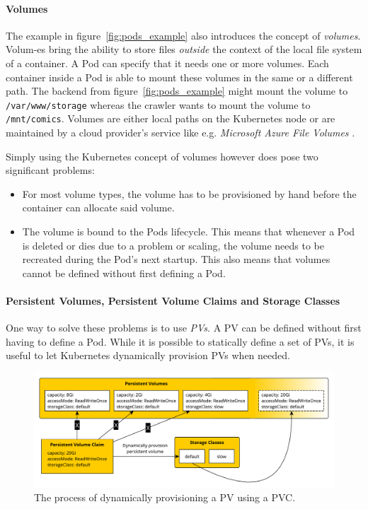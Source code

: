 \paragraph{Volumes}%
\label{par:Volumes}

The example in figure~\ref{fig:pods_example} also introduces the concept of
\textit{volumes}. Volum-es bring the ability to store files \textit{outside} the
context of the local file system of a container. A Pod can specify that it
needs one or more volumes. Each container inside a Pod is able to mount these
volumes in the same or a different path. The backend from
figure~\ref{fig:pods_example} might mount the volume to
\texttt{/var/www/storage} whereas the crawler wants to mount the volume to
\texttt{/mnt/comics}. Volumes are either local paths on the Kubernetes node or
are maintained by a cloud provider's service like e.g. \textit{Microsoft Azure
File Volumes} \autocite[Ch. 6]{LuksaKubernetesAction2017}.

Simply using the Kubernetes concept of volumes however does pose two significant problems:
\begin{itemize}
  \item For most volume types, the volume has to be provisioned by hand before
    the container can allocate said volume.
  \item The volume is bound to the Pods lifecycle. This means that whenever a
    Pod is deleted or dies due to a problem or scaling, the volume needs
    to be recreated during the Pod's next startup. This also means that volumes
    cannot be defined without first defining a Pod.
\end{itemize}

\paragraph{Persistent Volumes, Persistent Volume Claims and Storage Classes}%
\label{par:Persistent_Volume_Claims_and_Storage_Classes}
One way to solve these problems is to use \textit{\acfp{PV}}. A \ac{PV} can be
defined without first having to define a Pod. While it is possible to
statically define a set of \acp{PV}, it is useful to let Kubernetes dynamically
provision \acp{PV} when needed.

\begin{figure}[H]
\begin{center}
  \includegraphics[scale=0.5]{images/figures/pvs.pdf}
\end{center}
\caption{The process of dynamically provisioning a \acf{PV} using a \acf{PVC}.}%
\label{fig:dynamic_pvs}
\end{figure}

